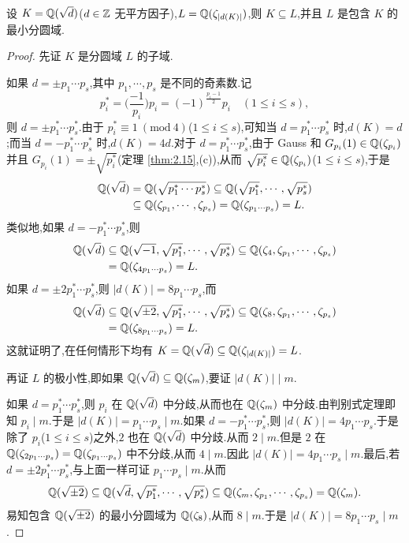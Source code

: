\begin{theorem}\label{thm:2.17}
设 $K=\mathbb{Q}(\sqrt{d})$($d\in\mathbb{Z}$ 无平方因子),$L=\mathbb{Q}(\zeta_{|d(K)|})$,则 $K\subseteq L$,并且 $L$ 是包含 $K$ 的最小分圆域.
\end{theorem}

\begin{proof}
先证 $K$ 是分圆域 $L$ 的子域.

如果 $d=\pm p_1\cdots p_s$,其中 $p_1,\cdots,p_s$ 是不同的奇素数.记
\[
  p_i^*=\Big(\frac{-1}{p_i}\Big)p_i=(-1)^{\frac{p_i-1}{2}}p_i\quad (1\leqslant i\leqslant s),
\]
则 $d=\pm p_1^*\cdots p_s^*$.由于 $p_i^*\equiv 1\ (\mathrm{mod}\ 4)$($1\leqslant i\leqslant s$),可知当 $d=p_1^*\cdots p_s^*$ 时,$d(K)=d$;而当 $d=-p_1^*\cdots p_s^*$ 时,$d(K)=4d$.对于 $d=p_1^*\cdots p_s^*$,由于 Gauss 和 $G_{p_i}(1)\in\mathbb{Q}(\zeta_{p_i})$ 并且 $G_{p_i}(1)=\pm\sqrt{p_i^*}$(定理 \ref{thm:2.15},(c)),从而 $\sqrt{p_i^*}\in\mathbb{Q}(\zeta_{p_i})$($1\leqslant i\leqslant s$),于是
\begin{align*}
  \mathbb{Q}(\sqrt{d})&=\mathbb{Q}(\sqrt{p_1^*\cdots p_s^*})
  \subseteq\mathbb{Q}(\sqrt{p_1^*},\cdots,\sqrt{p_s^*})\\
  &\subseteq\mathbb{Q}(\zeta_{p_1},\cdots,\zeta_{p_s})=\mathbb{Q}(\zeta_{p_1\cdots p_s})=L.
\end{align*}
类似地,如果 $d=-p_1^*\cdots p_s^*$,则
\begin{align*}
  \mathbb{Q}(\sqrt{d})&\subseteq\mathbb{Q}(\sqrt{-1},\sqrt{p_1^*},\cdots,\sqrt{p_s^*})
  \subseteq\mathbb{Q}(\zeta_4,\zeta_{p_1},\cdots,\zeta_{p_s})\\
  &=\mathbb{Q}(\zeta_{4p_1\cdots p_s})=L.
\end{align*}
如果 $d=\pm 2p_1^*\cdots p_s^*$,则 $|d(K)|=8p_1\cdots p_s$,而
\begin{align*}
  \mathbb{Q}(\sqrt{d})&\subseteq\mathbb{Q}(\sqrt{\pm 2},\sqrt{p_1^*},\cdots,\sqrt{p_s^*})
  \subseteq\mathbb{Q}(\zeta_8,\zeta_{p_1},\cdots,\zeta_{p_s})\\
  &=\mathbb{Q}(\zeta_{8p_1\cdots p_s})=L.
\end{align*}
这就证明了,在任何情形下均有 $K=\mathbb{Q}(\sqrt{d})\subseteq\mathbb{Q}(\zeta_{|d(K)|})=L$.

再证 $L$ 的极小性,即如果 $\mathbb{Q}(\sqrt{d})\subseteq\mathbb{Q}(\zeta_m)$,要证 $|d(K)|\mid m$.

如果 $d=p_1^*\cdots p_s^*$,则 $p_i$ 在 $\mathbb{Q}(\sqrt{d})$ 中分歧,从而也在 $\mathbb{Q}(\zeta_m)$ 中分歧.由判别式定理即知 $p_i\mid m$.于是 $|d(K)|=p_1\cdots p_s\mid m$.如果 $d=-p_1^*\cdots p_s^*$,则 $|d(K)|=4p_1\cdots p_s$.于是除了 $p_i$($1\leqslant i\leqslant s$)之外,$2$ 也在 $\mathbb{Q}(\sqrt{d})$ 中分歧.从而 $2\mid m$.但是 $2$ 在 $\mathbb{Q}(\zeta_{2p_1\cdots p_s})=\mathbb{Q}(\zeta_{p_1\cdots p_s})$ 中不分歧,从而 $4\mid m$.因此 $|d(K)|=4p_1\cdots p_s\mid m$.最后,若 $d=\pm 2p_1^*\cdots p_s^*$,与上面一样可证 $p_1\cdots p_s\mid m$.从而
\[
  \mathbb{Q}(\sqrt{\pm 2})\subseteq\mathbb{Q}(\sqrt{d},\sqrt{p_1^*},\cdots,\sqrt{p_s^*})
  \subseteq\mathbb{Q}(\zeta_m,\zeta_{p_1},\cdots,\zeta_{p_s})=\mathbb{Q}(\zeta_m).
\]
易知包含 $\mathbb{Q}(\sqrt{\pm 2})$ 的最小分圆域为 $\mathbb{Q}(\zeta_8)$,从而 $8\mid m$.于是 $|d(K)|=8p_1\cdots p_s\mid m$.
\end{proof}

